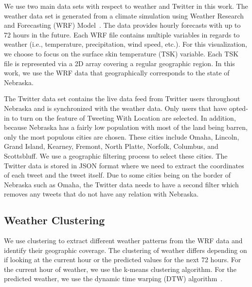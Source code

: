 We use two main data sets with respect to weather and Twitter in this work. The weather data set is generated from a climate simulation using Weather Research and Forecasting (WRF) Model~\cite{Michalakes2004}. %
The data provides hourly forecasts with up to 72 hours in the future. Each WRF file contains multiple variables in regards to weather (i.e., temperature, precipitation, wind speed, etc.). For this visualization, we choose to focus on the surface skin temperature (TSK) variable. Each TSK file is represented via a 2D array %
covering a regular geographic region. In this work, we use the WRF data that geographically corresponds to the state of Nebraska.

The Twitter data set contains the live data feed from Twitter users throughout Nebraska and is synchronized with the weather data. Only users that have opted-in to turn on the feature of Tweeting With Location are selected. In addition, because Nebraska has a fairly low population with most of the land being barren, only the most populous cities are chosen. These cities include Omaha, Lincoln, Grand Island, Kearney, Fremont, North Platte, Norfolk, Columbus, and Scottsbluff. We use a geographic filtering process to select these cities. The Twitter data is stored in JSON format where we need to extract the coordinates of each tweet and the tweet itself. Due to some cities being on the border of Nebraska such as Omaha, the Twitter data needs to have a second filter which removes any tweets that do not have any relation with Nebraska.


\subsection{Weather Clustering}
\label{sec:clust}

We use clustering to extract different weather patterns from the WRF data and identify their geographic coverage. The clustering of weather differs depending on if looking at the current hour or the predicted values for the next 72 hours. For the current hour of weather, we use the k-means clustering algorithm. %
For the predicted weather, we use the dynamic time warping (DTW) algorithm~\cite{salvador2007toward}.

